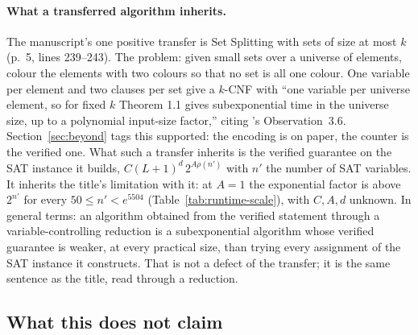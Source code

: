 \paragraph{What a transferred algorithm inherits.}
The manuscript's one positive transfer is Set Splitting with sets of
size at most $k$ (p.~5, lines 239--243). The problem: given small sets
over a universe of elements, colour the elements with two colours so that
no set is all one colour. One variable per element and two clauses per
set give a $k$-CNF with ``one variable per universe
element, so for fixed $k$ Theorem 1.1 gives subexponential time in the
universe size, up to a polynomial input-size factor,'' citing
\citet{Cygan2016}'s Observation~3.6. Section~\ref{sec:beyond} tags this
supported: the encoding is on paper, the counter is the verified one.
What such a transfer inherits is the verified guarantee on the SAT
instance it builds, $C(L+1)^d\,2^{A\rho(n')}$ with $n'$ the number of
SAT variables. It inherits the title's limitation with it: at $A = 1$
the exponential factor is above $2^{n'}$ for every
$50 \le n' < e^{5504}$ (Table~\ref{tab:runtime-scale}), with $C, A, d$
unknown. In general terms: an algorithm obtained from the verified
statement through a variable-controlling reduction is a subexponential
algorithm whose verified guarantee is weaker, at every practical size,
than trying every assignment of the SAT instance it constructs. That is
not a defect of the transfer; it is the same sentence as the title,
read through a reduction.

\subsection{What this does not claim}
\label{sec:consequences-not}

